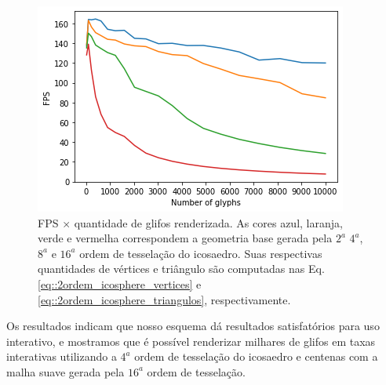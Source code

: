 \documentclass[
    12pt,                %
    oneside,            %
    a4paper,            %
    english,            %
    french,                %
    spanish,            %
    brazil                %
    ]{abntex2}
\begin{document}
\begin{figure}[htb]
    \centering
    \includegraphics[width=.65\linewidth, angle=0]{figs/Esquema_Glifo/benchmark_half_texopt.png}
    \caption{FPS $\times$ quantidade de glifos renderizada. As cores azul, laranja, verde e vermelha correspondem a geometria base gerada pela $2^{a}$ $4^{a}$, $8^{a}$ e $16^{a}$ ordem de tesselação do icosaedro. Suas respectivas quantidades de vértices e triângulo são computadas nas Eq. \ref{eq::2ordem_icosphere_vertices} e \ref{eq::2ordem_icosphere_triangulos}, respectivamente.}
    \label{fig::slice_benchmark}
\end{figure}

Os resultados indicam que nosso esquema dá resultados satisfatórios para uso interativo, e mostramos que é possível renderizar milhares de glifos em taxas interativas utilizando a $4^{a}$ ordem de tesselação do icosaedro e centenas com a malha suave gerada pela $16^{a}$ ordem de tesselação.






\end{document}
